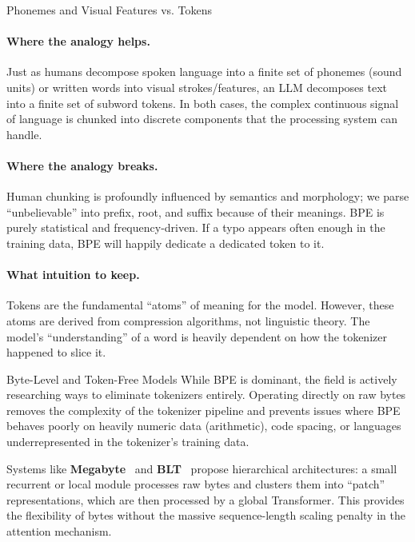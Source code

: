 \begin{analogybox}{Phonemes and Visual Features vs. Tokens}
  \paragraph{Where the analogy helps.}
  Just as humans decompose spoken language into a finite set of phonemes (sound units) or written words into visual strokes/features, an LLM decomposes text into a finite set of subword tokens. In both cases, the complex continuous signal of language is chunked into discrete components that the processing system can handle.

  \paragraph{Where the analogy breaks.}
  Human chunking is profoundly influenced by semantics and morphology; we parse ``unbelievable'' into prefix, root, and suffix because of their meanings. BPE is purely statistical and frequency-driven. If a typo appears often enough in the training data, BPE will happily dedicate a dedicated token to it.

  \paragraph{What intuition to keep.}
  Tokens are the fundamental ``atoms'' of meaning for the model. However, these atoms are derived from compression algorithms, not linguistic theory. The model's ``understanding'' of a word is heavily dependent on how the tokenizer happened to slice it.
\end{analogybox}

\begin{updatecard}{Byte-Level and Token-Free Models}
While BPE is dominant, the field is actively researching ways to eliminate tokenizers entirely. Operating directly on raw bytes removes the complexity of the tokenizer pipeline and prevents issues where BPE behaves poorly on heavily numeric data (arithmetic), code spacing, or languages underrepresented in the tokenizer's training data. 

Systems like \textbf{Megabyte}~\parencite{megabyte_2023} and \textbf{BLT}~\parencite{blt_2024} propose hierarchical architectures: a small recurrent or local module processes raw bytes and clusters them into ``patch'' representations, which are then processed by a global Transformer. This provides the flexibility of bytes without the massive sequence-length scaling penalty in the attention mechanism.
\end{updatecard}


